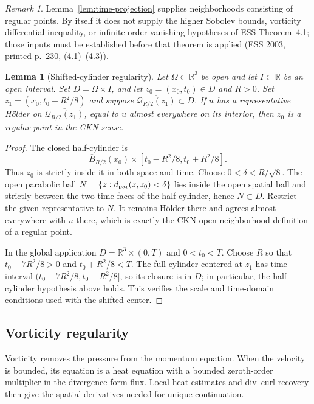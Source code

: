 \documentclass[11pt,letterpaper]{article}
\numberwithin{equation}{section}
\theoremstyle{plain}
\newtheorem{lemma}[theorem]{Lemma}
\theoremstyle{definition}
\theoremstyle{remark}
\newtheorem{remark}[theorem]{Remark}
\begin{document}
\begin{remark}
Lemma~\ref{lem:time-projection} supplies neighborhoods consisting of
regular points.  By itself it does not supply the higher Sobolev bounds,
vorticity differential inequality, or infinite-order vanishing hypotheses
of ESS Theorem~4.1; those inputs must be established before that theorem is
applied (ESS 2003, printed p.~230, (4.1)--(4.3)).
\end{remark}

\begin{lemma}[Shifted-cylinder regularity]\label{lem:regular-point-shift}
Let $\Omega\subset\mathbb R^3$ be open and let $I\subset\mathbb R$ be an
open interval.  Set $D=\Omega\times I$, and let $z_0=(x_0,t_0)\in D$ and
$R>0$.  Set
$z_1=(x_0,t_0+R^2/8)$ and suppose
$\overline{\mathcal Q_{R/2}(z_1)}\subset D$.  If $u$ has a representative
Hölder on $\overline{\mathcal Q_{R/2}(z_1)}$, equal to $u$ almost everywhere
on its interior, then $z_0$ is a regular point in the CKN sense.
\end{lemma}

\begin{proof}
The closed half-cylinder is
\[
 \overline B_{R/2}(x_0)\times
 [t_0-R^2/8,t_0+R^2/8].
\]
Thus $z_0$ is strictly inside it in both space and time.  Choose
$0<\delta<R/\sqrt 8$.  The open parabolic ball
$N=\{z:d_{\rm par}(z,z_0)<\delta\}$ lies inside the open spatial ball
and strictly between the two time faces of the half-cylinder, hence
$N\subset D$.  Restrict the given representative to $N$.  It remains
Hölder there and agrees almost everywhere with $u$ there, which is exactly
the CKN open-neighborhood definition of a regular point.

In the global application $D=\mathbb R^3\times(0,T)$ and $0<t_0<T$.
Choose $R$ so that
$t_0-7R^2/8>0$ and $t_0+R^2/8<T$.  The full cylinder centered at $z_1$
has time interval $(t_0-7R^2/8,t_0+R^2/8]$, so its closure is in $D$;
in particular, the half-cylinder hypothesis above holds.  This verifies
the scale and time-domain conditions used with the shifted center.
\end{proof}

\subsection{Vorticity regularity}\label{subsec:vorticity-regularity}

Vorticity removes the pressure from the momentum equation. When the velocity is bounded, its equation is a heat equation with a bounded zeroth-order multiplier in the divergence-form flux. Local heat estimates and div--curl recovery then give the spatial derivatives needed for unique continuation.
\end{document}
